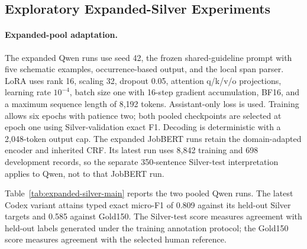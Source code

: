 \subsection{Exploratory Expanded-Silver Experiments}
\label{sec:expanded-silver}
\paragraph{Expanded-pool adaptation.}
The expanded Qwen runs use seed 42, the frozen shared-guideline prompt with five schematic examples, occurrence-based output, and the local span parser. LoRA uses rank 16, scaling 32, dropout 0.05, attention q/k/v/o projections, learning rate $10^{-4}$, batch size one with 16-step gradient accumulation, BF16, and a maximum sequence length of 8,192 tokens. Assistant-only loss is used. Training allows six epochs with patience two; both pooled checkpoints are selected at epoch one using Silver-validation exact F1. Decoding is deterministic with a 2,048-token output cap. The expanded JobBERT runs retain the domain-adapted encoder and inherited CRF. Its latest run uses 8,842 training and 698 development records, so the separate 350-sentence Silver-test interpretation applies to Qwen, not to that JobBERT run.


Table~\ref{tab:expanded-silver-main} reports the two pooled Qwen runs. The latest Codex variant attains typed exact micro-F1 of 0.809 against its held-out Silver targets and 0.585 against Gold150. The Silver-test score measures agreement with held-out labels generated under the training annotation protocol; the Gold150 score measures agreement with the selected human reference.


